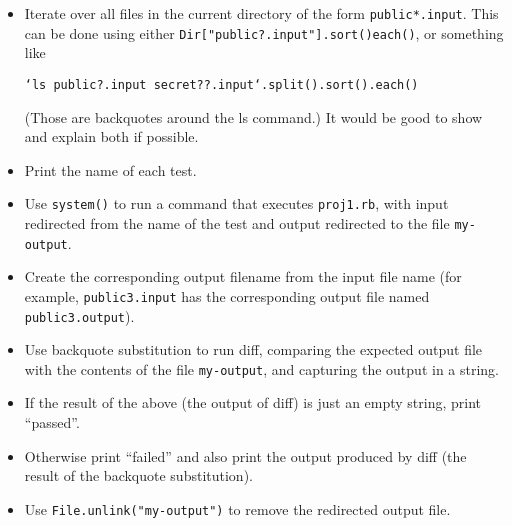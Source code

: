 \documentclass[12pt]{article}
\begin{document}
      \begin{itemize}

        \addtolength{\itemsep}{-.5mm}

        \item Iterate over all files in the current directory of the form
              \texttt{public*.input}.  This can be done using either
              \texttt{Dir["public?.input"].sort()each()}, or something like

              \smallskip

              \begin{centering}

                \texttt{`ls public?.input
                        secret??.input`.split().sort().each()}

              \end{centering}

              \medskip

              (Those are backquotes around the ls command.)  It would be
              good to show and explain both if possible.

        \item Print the name of each test.

        \item Use \texttt{system()} to run a command that executes
              \texttt{proj1.rb}, with input redirected from the name of the
              test and output redirected to the file \texttt{my-output}.

        \item Create the corresponding output filename from the input file
              name (for example, \texttt{public3.input} has the
              corresponding output file named \texttt{public3.output}).

        \item Use backquote substitution to run diff, comparing the expected
              output file with the contents of the file \texttt{my-output},
              and capturing the output in a string.

        \item If the result of the above (the output of diff) is just an
              empty string, print ``passed''.

        \item Otherwise print ``failed'' and also print the output produced
              by diff (the result of the backquote substitution).

        \item Use \texttt{File.unlink("my-output")} to remove the
              redirected output file.

      \end{itemize}
\end{document}
